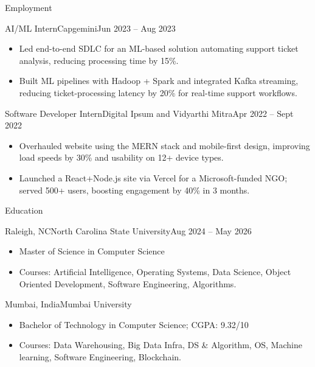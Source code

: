 \documentclass[]{mcdowellcv}
\begin{document}
\begin{cvsection}{Employment}
  \begin{cvsubsection}{AI/ML Intern}{Capgemini}{Jun 2023 -- Aug 2023}
    \begin{itemize}
      \item Led end-to-end SDLC for an ML-based solution automating support ticket analysis, reducing processing time by 15\%.
      \item Built ML pipelines with Hadoop + Spark and integrated Kafka streaming, reducing ticket-processing latency by 20\% for real-time support workflows.
    \end{itemize}
    \vspace{-1.5pt}
  \end{cvsubsection}

  \begin{cvsubsection}{Software Developer Intern}{Digital Ipsum and Vidyarthi Mitra}{Apr 2022 -- Sept 2022}
    \begin{itemize}
      \item Overhauled website using the MERN stack and mobile-first design, improving load speeds by 30\% and usability on 12+ device types.
      \item Launched a React+Node.js site via Vercel for a Microsoft-funded NGO; served 500+ users, boosting engagement by 40\% in 3 months.    
    \end{itemize}
  \end{cvsubsection}

\end{cvsection}

\begin{cvsection}{Education}
  \begin{cvsubsection}{Raleigh, NC}{North Carolina State University}{Aug 2024 -- May 2026}
    \begin{itemize}
      \item Master of Science in Computer Science
      \item Courses: Artificial Intelligence, Operating Systems, Data Science, Object Oriented Development, Software Engineering, Algorithms.
    \end{itemize}
    \vspace{-1.5pt}
  \end{cvsubsection}

  \begin{cvsubsection}{Mumbai, India}{Mumbai University}{}
    \begin{itemize}
      \item Bachelor of Technology in Computer Science; CGPA: 9.32/10
      \item Courses: Data Warehousing, Big Data Infra, DS \& Algorithm, OS, Machine learning, Software Engineering, Blockchain.
    \end{itemize}
  \end{cvsubsection}
\end{cvsection}
\end{document}
